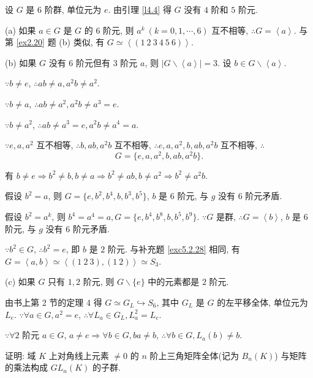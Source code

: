 \documentclass[color=black,device=normal,lang=cn,mode=geye]{elegantnote}
\begin{document}
\begin{solution}
    设 $G$ 是 $6$ 阶群, 单位元为 $e$. 由引理 \ref{l4.4} 得 $G$ 没有 $4$ 阶和 $5$ 阶元.
    
    (a) 如果 $a\in G$ 是 $G$ 的 $6$ 阶元, 则 $a^k\ (k=0,1,\cdots,6)$ 互不相等, $\therefore G=\left<a\right>$. 与第 \ref{ex2.20} 题 (b) 类似, 有 $G\simeq\left<(1\ 2\ 3\ 4\ 5\ 6)\right>$.

    (b) 如果 $G$ 没有 $6$ 阶元但有 $3$ 阶元 $a$, 则 $|G\backslash\left<a\right>|=3$. 设 $b\in G\backslash\left<a\right>$.

    $\because b\neq e$, $\therefore ab\neq a,a^2b\neq a^2$.
    
    $\because b\neq a$, $\therefore ab\neq a^2,a^2b\neq a^3=e$. 
    
    $\because b\neq a^2$, $\therefore ab\neq a^3=e,a^2b\neq a^4=a$.

    $\because e,a,a^2$ 互不相等, $\therefore b,ab,a^2b$ 互不相等, $\therefore e,a,a^2,b,ab,a^2b$ 互不相等, $\therefore$
    \[G=\{e,a,a^2,b,ab,a^2b\}.\]

    有 $b\neq e\Rightarrow b^2\neq b,b\neq a\Rightarrow b^2\neq ab,b\neq a^2\Rightarrow b^2\neq a^2b$.

    假设 $b^2=a$, 则 $G=\{e,b^2,b^4,b,b^3,b^5\}$, $b$ 是 $6$ 阶元, 与 $g$ 没有 $6$ 阶元矛盾.

    假设 $b^2=a^k$, 则 $b^4=a^4=a,G=\{e,b^4,b^8,b,b^5,b^9\}$. $\because G$ 是群, $\therefore G=\left<b\right>$, $b$ 是 $6$ 阶元, 与 $g$ 没有 $6$ 阶元矛盾.

    $\because b^2\in G$, $\therefore b^2=e$, 即 $b$ 是 $2$ 阶元. 与补充题 \ref{exc5.2.28} 相同, 有 $G=\left<a,b\right>\simeq\left<(1\ 2\ 3),(1\ 2)\right>\simeq S_3$.

    (c) 如果 $G$ 只有 $1,2$ 阶元, 则 $G\backslash\{e\}$ 中的元素都是 $2$ 阶元.

    由书上第 2 节的定理 4 得 $G\simeq G_L\hookrightarrow S_6$, 其中 $G_L$ 是 $G$ 的左平移全体, 单位元为 $L_e$. $\because\forall a\in G,a^2=e$, $\therefore\forall L_a\in G_L,L_a^2=L_e$.

    $\because\forall2$ 阶元 $a\in G$, $a\neq e\Rightarrow\forall b\in G,ba\neq b$, $\therefore\forall b\in G,L_a(b)\neq b$.
\end{solution}
\begin{exercisec}
    证明: 域 $K$ 上对角线上元素 $\neq0$ 的 $n$ 阶上三角矩阵全体(记为 $B_n(K)$) 与矩阵的乘法构成 $ GL_n(K)$ 的子群.
\end{exercisec}
\end{document}
